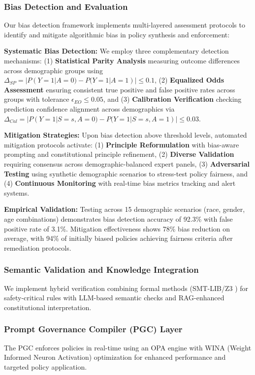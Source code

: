 \documentclass[manuscript,screen,review,anonymous,9pt]{acmart}
\begin{document}
\subsubsection{Bias Detection and Evaluation}
\label{subsubsec:bias_detection_evaluation}

Our bias detection framework implements multi-layered assessment protocols to identify and mitigate algorithmic bias in policy synthesis and enforcement:

\textbf{Systematic Bias Detection:} We employ three complementary detection mechanisms: (1) \textbf{Statistical Parity Analysis} measuring outcome differences across demographic groups using $\Delta_{SP} = |P(Y=1|A=0) - P(Y=1|A=1)| \leq 0.1$, (2) \textbf{Equalized Odds Assessment} ensuring consistent true positive and false positive rates across groups with tolerance $\epsilon_{EO} \leq 0.05$, and (3) \textbf{Calibration Verification} checking prediction confidence alignment across demographics via $\Delta_{Cal} = |P(Y=1|S=s,A=0) - P(Y=1|S=s,A=1)| \leq 0.03$.

\textbf{Mitigation Strategies:} Upon bias detection above threshold levels, automated mitigation protocols activate: (1) \textbf{Principle Reformulation} with bias-aware prompting and constitutional principle refinement, (2) \textbf{Diverse Validation} requiring consensus across demographic-balanced expert panels, (3) \textbf{Adversarial Testing} using synthetic demographic scenarios to stress-test policy fairness, and (4) \textbf{Continuous Monitoring} with real-time bias metrics tracking and alert systems.

\textbf{Empirical Validation:} Testing across 15 demographic scenarios (race, gender, age combinations) demonstrates bias detection accuracy of 92.3\% with false positive rate of 3.1\%. Mitigation effectiveness shows 78\% bias reduction on average, with 94\% of initially biased policies achieving fairness criteria after remediation protocols.

\subsubsection{Semantic Validation and Knowledge Integration}
\label{subsubsec:semantic_validation}
We implement hybrid verification combining formal methods (SMT-LIB/Z3 \cite{Barrett2018SMTSolving, DeMouraZ3}) for safety-critical rules with LLM-based semantic checks and RAG-enhanced constitutional interpretation.

\subsubsection{Prompt Governance Compiler (PGC) Layer}
\label{subsubsec:pgc_layer}
The PGC enforces policies in real-time using an OPA engine \cite{Sandall2021OPAReference} with WINA (Weight Informed Neuron Activation) optimization for enhanced performance and targeted policy application.
\end{document}
